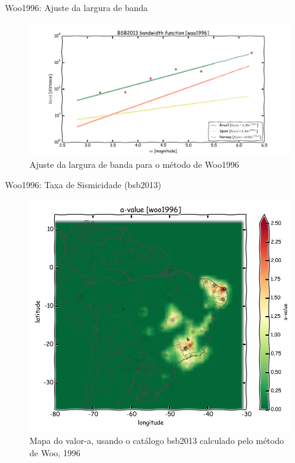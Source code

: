\documentclass[ucs,8pt]{beamer}
\begin{document}
\begin{frame}{Woo1996: Ajuste da largura de banda}
\begin{figure}[H]
  \centering
  \includegraphics[width=.95\textwidth]{woo_bandwidth} 
  \caption{Ajuste da largura de banda para o método de Woo1996}
  \label{fig:woo_b} 
\end{figure}
\end{frame}


\begin{frame}{Woo1996: Taxa de Sismicidade (\gls{bsb2013})}

\begin{figure}[H]
  \centering
  \includegraphics[height=.95\textheight]{a_woo} 
  \caption{Mapa do valor-a, usando o catálogo \gls{bsb2013} calculado pelo método de Woo, 1996 }
  \label{fig:a_woo} 
\end{figure}

\end{frame}
\end{document}
